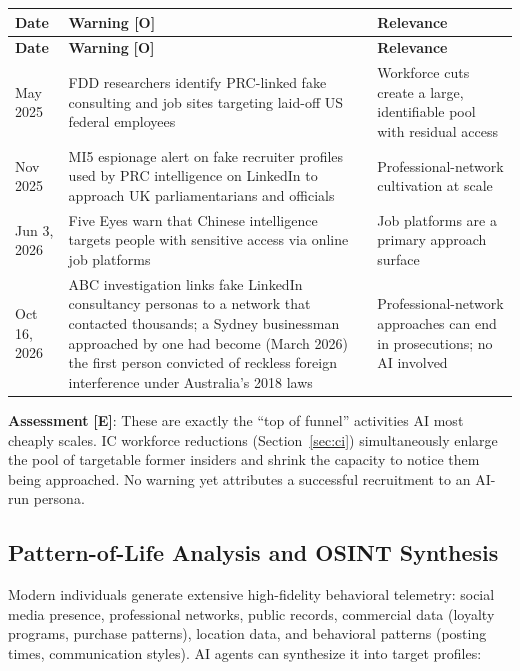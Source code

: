 \documentclass[11pt,letterpaper]{article}
\newcommand{\etraneed}[1]{\par\ifdim\pagegoal<\maxdimen\ifdim\pagetotal<\pagegoal\ifdim\dimexpr\pagegoal-\pagetotal\relax<\dimexpr#1\relax\newpage\fi\fi\fi}
\begin{document}
\etraneed{11\baselineskip}
{\small
\begin{longtable}{L{2.2cm}L{6.2cm}L{4.4cm}}
\toprule
\textbf{Date} & \textbf{Warning} \textbf{[O]} & \textbf{Relevance} \\
\midrule
\endfirsthead
\toprule
\textbf{Date} & \textbf{Warning} \textbf{[O]} & \textbf{Relevance} \\
\midrule
\endhead
May 2025 & FDD researchers identify PRC-linked fake consulting and job sites targeting laid-off US federal employees & Workforce cuts create a large, identifiable pool with residual access \\*
Nov 2025 & MI5 espionage alert on fake recruiter profiles used by PRC intelligence on LinkedIn to approach UK parliamentarians and officials & Professional-network cultivation at scale \\*
Jun 3, 2026 & Five Eyes warn that Chinese intelligence targets people with sensitive access via online job platforms & Job platforms are a primary approach surface \\*
Oct 16, 2026 & ABC investigation links fake LinkedIn consultancy personas to a network that contacted thousands; a Sydney businessman approached by one had become (March 2026) the first person convicted of reckless foreign interference under Australia's 2018 laws & Professional-network approaches can end in prosecutions; no AI involved \\
\bottomrule
\end{longtable}}

\textbf{Assessment} \textbf{[E]}: These are exactly the ``top of funnel'' activities AI most cheaply scales. IC workforce reductions (Section~\ref{sec:ci}) simultaneously enlarge the pool of targetable former insiders and shrink the capacity to notice them being approached. No warning yet attributes a successful recruitment to an AI-run persona.

\subsection{Pattern-of-Life Analysis and OSINT Synthesis}

Modern individuals generate extensive high-fidelity behavioral telemetry: social media presence, professional networks, public records, commercial data (loyalty programs, purchase patterns), location data, and behavioral patterns (posting times, communication styles). AI agents can synthesize it into target profiles:
\end{document}
